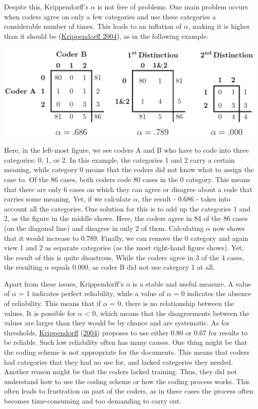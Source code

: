 \documentclass[
]{book}
\begin{document}
Despite this, Krippendorff's \(\alpha\) is not free of problems. One main problem occurs when coders agree on only a few categories and use these categories a considerable number of times. This leads to an inflation of \(\alpha\), making it is higher than it should be (\protect\hyperlink{ref-Krippendorff2004a}{Krippendorff 2004}), as in the following example:

\begin{center}\includegraphics[width=0.75\linewidth]{figures/kripp} \end{center}

Here, in the left-most figure, we see coders A and B who have to code into three categories: 0, 1, or 2. In this example, the categories 1 and 2 carry a certain meaning, while category 0 means that the coders did not know what to assign the case to. Of the 86 cases, both coders code 80 cases in the 0 category. This means that there are only 6 cases on which they can agree or disagree about a code that carries some meaning. Yet, if we calculate \(\alpha\), the result - 0.686 - takes into account all the categories. One solution for this is to add up the categories 1 and 2, as the figure in the middle shows. Here, the coders agree in 84 of the 86 cases (on the diagonal line) and disagree in only 2 of them. Calculating \(\alpha\) now shows that it would increase to 0.789. Finally, we can remove the 0 category and again view 1 and 2 as separate categories (as the most right-hand figure shows). Yet, the result of this is quite disastrous. While the coders agree in 3 of the 4 cases, the resulting \(\alpha\) equals 0.000, as coder B did not use category 1 at all.

Apart from these issues, Krippendorff's \(\alpha\) is a stable and useful measure. A value of \(\alpha\) = 1 indicates perfect reliability, while a value of \(\alpha\) = 0 indicates the absence of reliability. This means that if \(\alpha\) = 0, there is no relationship between the values. It is possible for \(\alpha\) \textless{} 0, which means that the disagreements between the values are larger than they would be by chance and are systematic. As for thresholds, \protect\hyperlink{ref-Krippendorff2004a}{Krippendorff} (\protect\hyperlink{ref-Krippendorff2004a}{2004}) proposes to use either 0.80 or 0.67 for results to be reliable. Such low reliability often has many causes. One thing might be that the coding scheme is not appropriate for the documents. This means that coders had categories that they had no use for, and lacked categories they needed. Another reason might be that the coders lacked training. Thus, they did not understand how to use the coding scheme or how the coding process works. This often leads to frustration on part of the coders, as in these cases the process often becomes time-consuming and too demanding to carry out.
\end{document}

